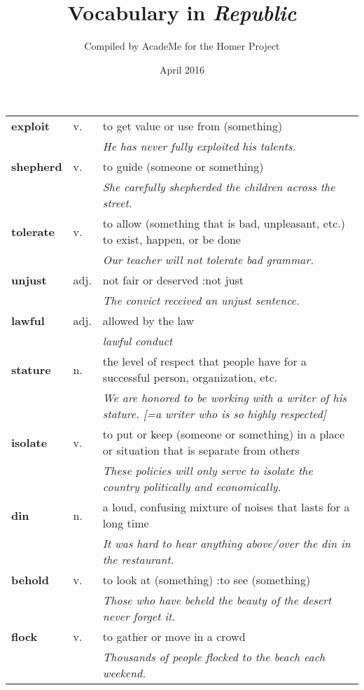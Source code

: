 \documentclass[a4paper]{article}
\title{Vocabulary in \textit{Republic}}
\author{Compiled by AcadeMe for the Homer Project}
\date{April 2016}
\begin{document}
\maketitle
\begin{longtable}{llp{11cm}}
\textbf{exploit} & v. &  to get value or use from (something) \\
 & & \textit{He has never fully exploited his talents.}\\[0.08cm]
\textbf{shepherd} & v. &  to guide (someone or something) \\
 & & \textit{She carefully shepherded the children across the street.}\\[0.08cm]
\textbf{tolerate} & v. &  to allow (something that is bad, unpleasant, etc.) to exist, happen, or be done \\
 & & \textit{Our teacher will not tolerate bad grammar.}\\[0.08cm]
\textbf{unjust} & adj. &  not fair or deserved :not just \\
 & & \textit{The convict received an unjust sentence.}\\[0.08cm]
\textbf{lawful} & adj. &  allowed by the law \\
 & & \textit{lawful conduct}\\[0.08cm]
\textbf{stature} & n. &  the level of respect that people have for a successful person, organization, etc. \\
 & & \textit{We are honored to be working with a writer of his stature. [=a writer who is so highly respected]}\\[0.08cm]
\textbf{isolate} & v. &  to put or keep (someone or something) in a place or situation that is separate from others \\
 & & \textit{These policies will only serve to isolate the country politically and economically.}\\[0.08cm]
\textbf{din} & n. &  a loud, confusing mixture of noises that lasts for a long time \\
 & & \textit{It was hard to hear anything above/over the din in the restaurant.}\\[0.08cm]
\textbf{behold} & v. &  to look at (something) :to see (something) \\
 & & \textit{Those who have beheld the beauty of the desert never forget it.}\\[0.08cm]
\textbf{flock} & v. &  to gather or move in a crowd \\
 & & \textit{Thousands of people flocked to the beach each weekend.}\\[0.08cm]

\end{longtable}
\end{document}
